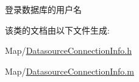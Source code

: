 登录数据库的用户名 



该类的文档由以下文件生成\-:\begin{DoxyCompactItemize}
\item 
Map/\hyperlink{_datasource_connection_info_8h}{Datasource\-Connection\-Info.\-h}\item 
Map/\hyperlink{_datasource_connection_info_8m}{Datasource\-Connection\-Info.\-m}\end{DoxyCompactItemize}
